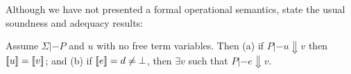 \begin{comment}
Types do not matter at all for our denotational semantics.
\begin{lemma}[Type irrelevance]
It is the case that $\interp{u}{\sigma}{\rho} = \interp{u[\ol{\tau}/\as]}{\sigma}{\rho}$ 
for any type substitution of variable $\as$ to types $\taus$.
\end{lemma}
The following is an essential lemma for establishing the soundness of denotational semantics:
\begin{lemma}[Substitutivity]
If $\Sigma;\Delta,x{:}\tau |- e : \tau$ and $\rho$ is a semantic environment 
and $\Sigma;\Delta |- e' : \tau'$ then 
\[ \interp{e}{\sigma}{\rho,x |-> \interp{e'}{\sigma}{\rho}} = \interp{e[e'/x]}{\sigma}{\rho} \]
and if $\Sigma;\Delta,x{:}\tau |- u : \tau$ then 
\[ \interp{u}{\sigma}{\rho,x |-> \interp{e'}{\sigma}{\rho}} = \interp{u[e'/x]}{\sigma}{\rho} \]
\end{lemma}
\end{comment}
Although we have not presented a formal operational semantics, state the usual
soundness and adequacy results:
\begin{theorem}
Assume $\Sigma |- P$ and $u$ with no free term variables. Then (a) if $P |- u \Downarrow v$ then $[\![u]\!] = [\![v]\!] $; and (b) if $[\![e]\!] = d \not= \bot$, then 
$\exists v$ such that $P |- e \Downarrow v$.
\end{theorem}
\begin{comment}
The proof of this theorem is also standard domain theory so we only sketch the 
high-level road-map: The proof proceeds by defining a {\em logical relation} between 
semantics and syntax, via the use of a bi-functor on admissible relations between elements 
of $D_\infty$ and closed expressions, and using minimal 
invariance~\cite{pitts-rel-domains} to show that this
bi-functor has a fixpoint. Adequacy then follows from the {\em fundamental theorem} of this 
logical relation, which asserts that every expression is related to its denotation.
\end{comment}

